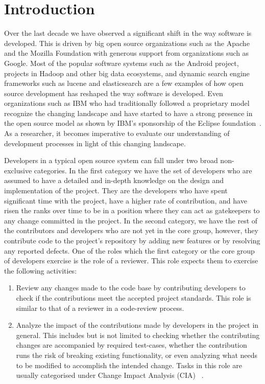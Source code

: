 
\section{Introduction}
\label{sec:intro}

Over the last decade we have observed a significant shift in the way software is developed. This is driven by big open source organizations such as the Apache and the Mozilla Foundation with generous support from organizations such as Google. Most of the popular software systems such as the Android project, projects in Hadoop and other big data ecosystems, and dynamic search engine frameworks such as lucene and elasticsearch are a few examples of how open source development has reshaped the way software is developed. Even organizations such as IBM who had traditionally followed a proprietary model recognize the changing landscape and have started to have a strong presence in the open source model as shown by IBM's sponsorship of the Eclipse foundation~\cite{Eclipse}. As a researcher, it becomes imperative to evaluate our understanding of development processes in light of this changing landscape.

Developers in a typical open source system can fall under two broad non-exclusive categories. In the first category we have the set of developers who are assumed to have a detailed and in-depth knowledge on the design and implementation of the project. They are the developers who have spent significant time with the project, have a higher rate of contribution, and have risen the ranks over time to be in a position where they can act as gatekeepers to any change committed in the project. In the second category, we have the rest of the contributors and developers who are not yet in the core group, however, they contribute code to the project's repository by adding new features or by resolving any reported defects. One of the roles which the first category or the core group of developers exercise is the role of a reviewer. This role expects them to exercise the following activities:\\
\begin{enumerate}
\item Review any changes made to the code base by contributing developers to check if the contributions meet the accepted project standards. This role is similar to that of a reviewer in a code-review process.
\item Analyze the impact of the contributions made by developers in the project in general. This includes but is not limited to checking whether the contributing changes are accompanied by required test-cases, whether the contribution runs the risk of breaking existing functionality, or even analyzing what needs to be modified to accomplish the intended change. Tasks in this role are usually categorised under Change Impact Analysis (CIA) ~\cite{STVSTVR1475}.
\end{enumerate}


